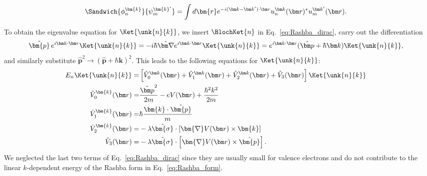 \begin{equation}
	\Sandwich{\phi_n^{\bm{k}}}{\psi_m^{\bm{k}'}} = \int d\bm{r} e^{-i (\bm k - \bm k') \cdot \bm r} u_n^{\bm k }(\bm r)^* u_m^{\bm k'}(\bm r).
\end{equation}

To obtain the eigenvalue equation for $\Ket{\unk{n}{k}}$, we insert $\BlochKet{n}$ in Eq.~\eqref{eq:Rashba_dirac}, carry out the differentiation
\begin{equation}
	\label{eq:Rashba_momentum}
\hat{\bm{p}} \, \Eikr\Ket{\unk{n}{k}} = -i \hbar \hat{\bm \nabla}\Eikr\Ket{\unk{n}{k}} = \Eikr(\hat{\bm p} + \hbar \bm k)\Ket{\unk{n}{k}},
\end{equation}
and similarly substitute $\hat{\bm{p}}^2 \rightarrow (\hat{\bm{p}}+\hbar \bm{k})^2$.
This leads to the following equations for $\Ket{\unk{n}{k}}$:
\begin{align}
	\label{eq:Rashba_unk_Vs}
	E_n \Ket{\unk{n}{k}} =& \left[\hat{V}_0^{\bm k}(\bm r) + \hat{V}_1^{\bm k}(\bm r)  +  \hat{V}_2^{\bm k}(\bm r) + \hat{V}_3(\bm r) \right] \Ket{\unk{n}{k}} \\
	\hat{V}_0^{\bm{k}}(\bm r) =& \frac{\hat{\bm p}^2}{2m} - eV(\bm r) + \frac{\hbar^2 k^2}{2m} \\
	\hat{V}_1^{\bm{k}}(\bm r) =& \hbar\frac{\bm{k}\cdot\hat{\bm{p}}}{m} \\
	\hat{V}_2^{\bm{k}}(\bm r) =& -\lambda \hat{\bm{\sigma}} \cdot \left[ \bm{\nabla}V(\bm r) \times \bm{k}\right] \\
	\hat{V}_3(\bm r) =& -\lambda \hat{\bm{\sigma}} \cdot \left[ \bm{\nabla}V(\bm r) \times \hat{\bm{p}}\right].
\end{align}
We neglected the last two terms of Eq.~\eqref{eq:Rashba_dirac} since they are usually small for valence electrons and do not contribute to the linear $k$-dependent energy of the Rashba form in Eq.~\eqref{eq:Rashba_form}.


